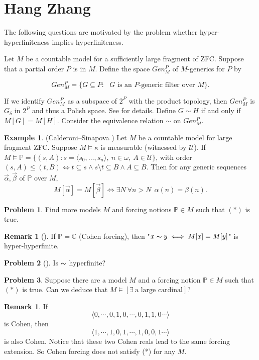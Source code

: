 \documentclass[11pt]{amsart}
\theoremstyle{definition}
\newtheorem{problem}{Problem}[section]
\newtheorem{example}[theorem]{Example}
\newtheorem{remark}[theorem]{Remark}
\begin{document}
\bigskip
\bigskip


\section{Hang Zhang}
The following questions are motivated by the problem whether hyper-\linebreak hyperfiniteness implies hyperfiniteness. 

Let $M$ be a   countable model for a sufficiently large
 fragment of ZFC. Suppose that a partial order $P$ is in $M$. Define the space $Gen^P_M$ of $M$-generics for $P$ by 
 
$$Gen^P_M= \{G \subseteq P:  \mbox{ $G$ is an $P$-generic filter over $M$}\}.$$

If we   identify $Gen^P_M$
 as a subspace of $2^P$  with the product topology, then $Gen^P_M$ is $G_\delta$ in  $2^P$ and thus a Polish space. See \cite{smythe} for details. Define $G\sim H $ if and only if $M[G]=M[H]$. Consider the equivalence relation $\sim$ on $Gen^P_M$.
 
\begin{example}
    (Calderoni--Sinapova \cite{CS}) Let $M$ be a countable model for large fragment ZFC.
Suppose $M\models \kappa$ is measurable (witnessed by $\mathcal{U}$). If $M\models \mathbb{P}=\{(s,A): s=\langle s_0,\dots, s_n\rangle,\ n\in\omega,\ A\in\mathcal{U}\}$, with order
$(s,A)\leq (t,B) \iff t\subseteq s \land s\setminus t\subseteq B \land A\subseteq B$.
Then for any generic sequences $\vec{\alpha}, \vec{\beta}$ of $\mathbb{P}$ over $M$, 
\[
M[\vec{\alpha}]=M[\vec{\beta}]\iff \exists N\ \forall n>N\ \ \alpha(n)=\beta(n) \tag{$*$}.
\]
\end{example}

\begin{problem}
    Find more models $M$ and forcing notions $\mathbb{P}\in M$ such that $(*)$ is true.
\end{problem}
\begin{remark}[{\cite[Theorem 3.1]{smythe}}]
If $\mathbb{P}=\mathbb{C}$ (Cohen forcing), then "$x\thicksim y\iff M[x]=M[y]$" is hyper-hyperfinite.
\end{remark}
\begin{problem}[{\cite[Question 5.2]{smythe}}]
 Is $\thicksim$ hyperfinite? 
\end{problem}
\begin{problem}
    Suppose there are a model $M$ and a forcing notion $\mathbb{P}\in M$ such that $(*)$ is true. Can we deduce that $M\models [\exists\  \text{a large cardinal}]$?
\end{problem}
\begin{remark}
    If $$\langle0,\cdots,0,1,0,\cdots,0,1,1,0\cdots\rangle$$
is Cohen, then $$\langle1,\cdots,1,0,1,\cdots,1,0,0,1\cdots\rangle$$ is also Cohen. Notice that these two Cohen reals lead to the same  forcing extension. So Cohen forcing does not satisfy (*) for any $M$.
\end{remark}    
\end{document}
